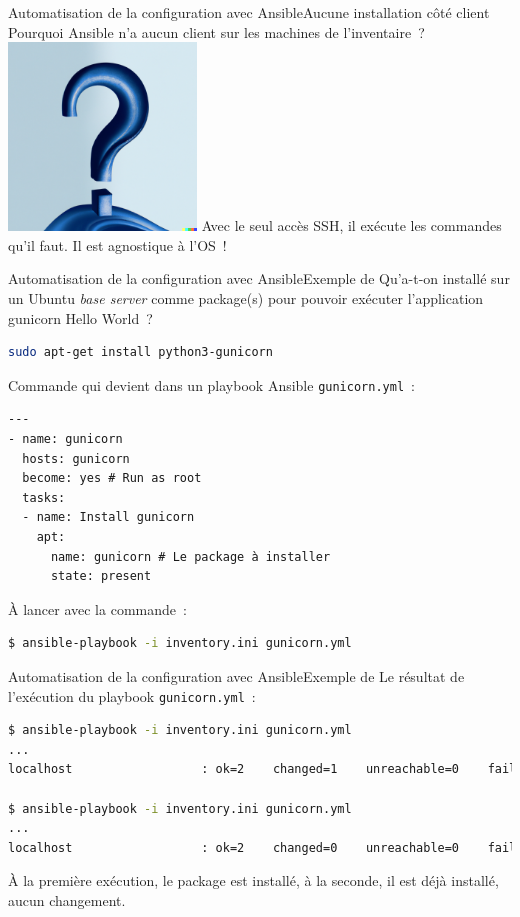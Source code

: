 \documentclass{beamer}
\begin{document}
    \begin{frame}{Automatisation de la configuration avec Ansible}{Aucune installation côté client}
        Pourquoi Ansible n'a aucun client sur les machines de l'inventaire~?
        \bigbreak
        \centering
        \includegraphics[width=5cm]{image/question-mark-on-a-blank-background}
        \bigbreak
        \pause
        \flushleft
        Avec le seul accès SSH, il exécute les commandes qu'il faut.
        Il est agnostique à l'OS~!
    \end{frame}

    \begin{frame}[fragile]{Automatisation de la configuration avec Ansible}{Exemple de }
        Qu'a-t-on installé sur un Ubuntu \textit{base server} comme package(s) pour pouvoir exécuter l'application gunicorn Hello World~?
        \pause
        \begin{lstlisting}[language=bash]
sudo apt-get install python3-gunicorn
        \end{lstlisting}
        Commande qui devient dans un playbook Ansible \lstinline{gunicorn.yml}~:
        \begin{lstlisting}
---
- name: gunicorn
  hosts: gunicorn
  become: yes # Run as root
  tasks:
  - name: Install gunicorn
    apt:
      name: gunicorn # Le package à installer
      state: present
        \end{lstlisting}
        À lancer avec la commande~:
        \begin{lstlisting}[language=bash]
$ ansible-playbook -i inventory.ini gunicorn.yml
        \end{lstlisting}
    \end{frame}

    \begin{frame}[fragile]{Automatisation de la configuration avec Ansible}{Exemple de }
        Le résultat de l'exécution du playbook \lstinline{gunicorn.yml}~:
        \begin{lstlisting}[language=bash]
$ ansible-playbook -i inventory.ini gunicorn.yml
...
localhost                  : ok=2    changed=1    unreachable=0    failed=0    skipped=0    rescued=0    ignored=0

$ ansible-playbook -i inventory.ini gunicorn.yml
...
localhost                  : ok=2    changed=0    unreachable=0    failed=0    skipped=0    rescued=0    ignored=0
        \end{lstlisting}
        À la première exécution, le package est installé, à la seconde, il est déjà installé, aucun changement.
    \end{frame}
\end{document}

